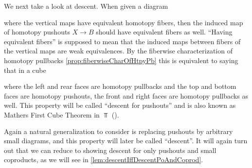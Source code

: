 We next take a look at descent.
When given a diagram 
\begin{center}
\end{center}
where the vertical maps have equivalent homotopy fibers, then the induced map of homotopy pushouts $X\to B$ should have equivalent fibers as well.
``Having equivalent fibers'' is supposed to mean that the induced maps between fibers of the vertical maps are weak equivalences.
By the fiberwise characterization of homotopy pullbacks \cref{prop:fiberwiseCharOfHtpyPb} this is equivalent to saying that in a cube 
\begin{center}
\end{center}
where the left and rear faces are homotopy pullbacks and the top and bottom faces are homotopy pushouts, the front and right faces are homotopy pullbacks as well.
This property will be called ``descent for pushouts'' and is also known as Mathers First Cube Theorem in $\Top$ (\cite[Theorem 18]{mather_1976}).

Again a natural generalization to consider is replacing pushouts by arbitrary small diagrams, and this property will later be called ``descent''.
It will again turn out that we can reduce to showing descent for only pushouts and small coproducts, as we will see in \cref{lem:descentIffDescentPoAndCoprod}.